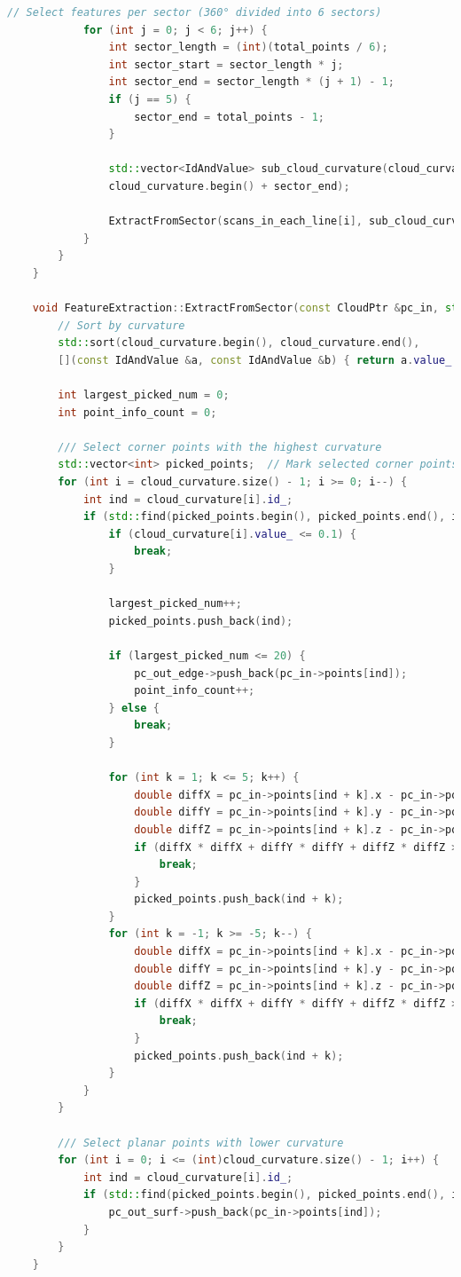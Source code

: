 \begin{lstlisting}[language=c++,caption=src/ch7/loam\_like/feature\_extraction.cc]
			// Select features per sector (360° divided into 6 sectors)  
			for (int j = 0; j < 6; j++) {  
				int sector_length = (int)(total_points / 6);  
				int sector_start = sector_length * j;  
				int sector_end = sector_length * (j + 1) - 1;  
				if (j == 5) {  
					sector_end = total_points - 1;  
				}  
				
				std::vector<IdAndValue> sub_cloud_curvature(cloud_curvature.begin() + sector_start,  
				cloud_curvature.begin() + sector_end);  
				
				ExtractFromSector(scans_in_each_line[i], sub_cloud_curvature, pc_out_edge, pc_out_surf);  
			}  
		}  
	}  
	
	void FeatureExtraction::ExtractFromSector(const CloudPtr &pc_in, std::vector<IdAndValue> &cloud_curvature, CloudPtr &pc_out_edge, CloudPtr &pc_out_surf) {  
		// Sort by curvature  
		std::sort(cloud_curvature.begin(), cloud_curvature.end(),  
		[](const IdAndValue &a, const IdAndValue &b) { return a.value_ < b.value_; });  
		
		int largest_picked_num = 0;  
		int point_info_count = 0;  
		
		/// Select corner points with the highest curvature  
		std::vector<int> picked_points;  // Mark selected corner points (neighboring points are excluded)  
		for (int i = cloud_curvature.size() - 1; i >= 0; i--) {  
			int ind = cloud_curvature[i].id_;  
			if (std::find(picked_points.begin(), picked_points.end(), ind) == picked_points.end()) {  
				if (cloud_curvature[i].value_ <= 0.1) {  
					break;  
				}  
				
				largest_picked_num++;  
				picked_points.push_back(ind);  
				
				if (largest_picked_num <= 20) {  
					pc_out_edge->push_back(pc_in->points[ind]);  
					point_info_count++;  
				} else {  
					break;  
				}  
				
				for (int k = 1; k <= 5; k++) {  
					double diffX = pc_in->points[ind + k].x - pc_in->points[ind + k - 1].x;  
					double diffY = pc_in->points[ind + k].y - pc_in->points[ind + k - 1].y;  
					double diffZ = pc_in->points[ind + k].z - pc_in->points[ind + k - 1].z;  
					if (diffX * diffX + diffY * diffY + diffZ * diffZ > 0.05) {  
						break;  
					}  
					picked_points.push_back(ind + k);  
				}  
				for (int k = -1; k >= -5; k--) {  
					double diffX = pc_in->points[ind + k].x - pc_in->points[ind + k + 1].x;  
					double diffY = pc_in->points[ind + k].y - pc_in->points[ind + k + 1].y;  
					double diffZ = pc_in->points[ind + k].z - pc_in->points[ind + k + 1].z;  
					if (diffX * diffX + diffY * diffY + diffZ * diffZ > 0.05) {  
						break;  
					}  
					picked_points.push_back(ind + k);  
				}  
			}  
		}  
		
		/// Select planar points with lower curvature  
		for (int i = 0; i <= (int)cloud_curvature.size() - 1; i++) {  
			int ind = cloud_curvature[i].id_;  
			if (std::find(picked_points.begin(), picked_points.end(), ind) == picked_points.end()) {  
				pc_out_surf->push_back(pc_in->points[ind]);  
			}  
		}  
	}  
\end{lstlisting}  

